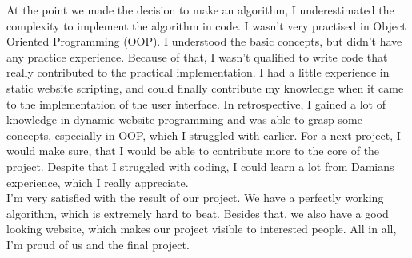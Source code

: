 At the point we made the decision to make an algorithm, I underestimated the complexity to implement the algorithm in code. I wasn't very practised in Object Oriented Programming (OOP). I understood the basic concepts, but didn't have any practice experience. Because of that, I wasn't qualified to write code that really contributed to the practical implementation.
I had a little experience in static website scripting, and could finally contribute my knowledge when it came to the implementation of the user interface. In retrospective, I gained a lot of knowledge in dynamic website programming and was able to grasp some concepts, especially in OOP, which I struggled with earlier. 
For a next project, I would make sure, that I would be able to contribute more to the core of the project.
Despite that I struggled with coding, I could learn a lot from Damians experience, which I really appreciate.\\

I'm very satisfied with the result of our project. We have a perfectly working algorithm, which is extremely hard to beat. Besides that, we also have a good looking website, which makes our project visible to interested people. All in all, I'm proud of us and the final project.






















